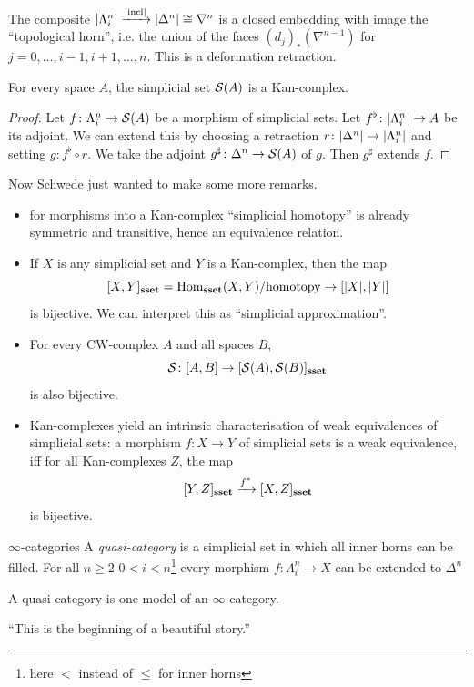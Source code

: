 \documentclass[language=english]{TemplateLecture}
\begin{document}
The composite \(\lvert\Lambda_i^n\rvert \xrightarrow{\lvert\operatorname{incl}\rvert} \lvert\Delta^n\rvert \cong \nabla^n\) is a closed embedding with image the \enquote{topological horn}, i.e. the union of the faces \((d_j)_*(\nabla^{n-1})\) for \(j= 0, \dots, i-1, i+1, \dots, n\). This is a deformation retraction.

\begin{corollary}
    For every space \(A\), the simplicial set \(\mathcal{S}(A)\) is a Kan-complex.
\end{corollary}

\begin{proof}
    Let \(f\colon \Lambda_i^n \to \mathcal{S}(A)\) be a morphism of simplicial sets. Let \(f^\flat\colon \lvert\Lambda_i^n\rvert \to A\) be its adjoint. We can extend this by choosing a retraction \(r\colon \lvert\Delta^n\rvert\to \lvert\Lambda_i^n\rvert\) and setting \(g\colon f^\flat \circ r\). We take the adjoint \(g^\sharp\colon \Delta^n \to \mathcal{S}(A)\) of \(g\). Then \(g^\sharp\) extends \(f\).
\end{proof}

Now Schwede just wanted to make some more remarks.

\begin{itemize}
    \item for morphisms into a Kan-complex \enquote{simplicial homotopy} is already symmetric and transitive, hence an equivalence relation.
    \item If \(X\) is any simplicial set and \(Y\) is a Kan-complex, then the map
    \[[X,Y]_{\mathbf{sset}} = \operatorname{Hom}_{\mathbf{sset}}(X,Y)/\text{homotopy} \to [\lvert X\rvert, \lvert Y\rvert]\]
    is bijective. We can interpret this as \enquote{simplicial approximation}.
    \item For every CW-complex \(A\) and all spaces \(B\),
    \[\mathcal{S}\colon [A,B] \to [\mathcal{S}(A), \mathcal{S}(B)]_{\mathbf{sset}}\]
    is also bijective.
    \item Kan-complexes yield an intrinsic characterisation of weak equivalences of simplicial sets: a morphism \(f\colon X \to Y\) of simplicial sets is a weak equivalence, iff for all Kan-complexes \(Z\), the map
    \[[Y,Z]_{\mathbf{sset}} \xrightarrow{f^*} [X,Z]_{\mathbf{sset}}\]
    is bijective.
\end{itemize}

\begin{defi}{\(\infty\)-categories}{}
    A \emph{quasi-category} is a simplicial set in which all inner horns can be filled. For all \(n \geq 2\) \(0 < i < n\)\footnote{here \(<\) instead of \(\leq\) for inner horns} every morphism \(f\colon \Lambda_i^n \to X\) can be extended to \(\Delta^n\)
\end{defi}

A quasi-category is one model of an \(\infty\)-category.


\enquote{This is the beginning of a beautiful story.}
\end{document}
